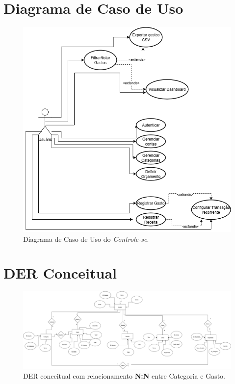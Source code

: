\documentclass[12pt,a4paper]{article}
\begin{document}
\section{Diagrama de Caso de Uso}
\begin{figure}[H]
  \centering
  \includegraphics[width=\textwidth,height=.86\textheight,keepaspectratio]{caso.png}
  \caption{Diagrama de Caso de Uso do \textit{Controle-se}.}
\end{figure}

\section{DER Conceitual}
\begin{figure}[H]
  \centering
  \includegraphics[width=\textwidth,height=.86\textheight,keepaspectratio]{DER.png}
  \caption{DER conceitual com relacionamento \textbf{N:N} entre Categoria e Gasto.}
\end{figure}
\end{document}
